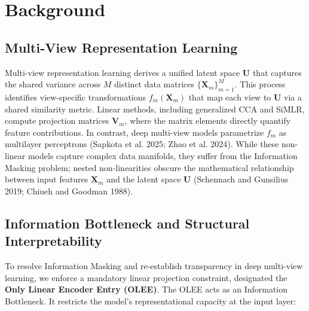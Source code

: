 \documentclass[
  letterpaper,
]{report}
\begin{document}
\section{Background}\label{background}

\subsection{Multi-View Representation
Learning}\label{multi-view-representation-learning}

Multi-view representation learning derives a unified latent space
\(\mathbf{U}\) that captures the shared variance across \(M\) distinct
data matrices \(\{\mathbf{X}_m\}_{m=1}^M\). This process identifies
view-specific transformations \(f_m(\mathbf{X}_m)\) that map each view
to \(\mathbf{U}\) via a shared similarity metric. Linear methods,
including generalized CCA and SiMLR, compute projection matrices
\(\mathbf{V}_m\), where the matrix elements directly quantify feature
contributions. In contrast, deep multi-view models parametrize \(f_m\)
as multilayer perceptrons (Sapkota et al. 2025; Zhao et al. 2024). While
these non-linear models capture complex data manifolds, they suffer from
the Information Masking problem; nested non-linearities obscure the
mathematical relationship between input features \(\mathbf{X}_m\) and
the latent space \(\mathbf{U}\) (Schennach and Gunsilius 2019; Chiueh
and Goodman 1988).

\subsection{Information Bottleneck and Structural
Interpretability}\label{information-bottleneck-and-structural-interpretability}

To resolve Information Masking and re-establish transparency in deep
multi-view learning, we enforce a mandatory linear projection
constraint, designated the \textbf{Only Linear Encoder Entry (OLEE)}.
The OLEE acts as an Information Bottleneck. It restricts the model's
representational capacity at the input layer:
\end{document}
